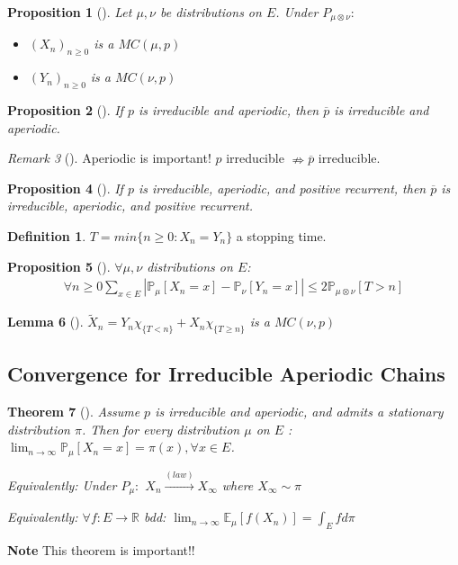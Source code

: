 \documentclass[12pt]{book}
\newtheorem{theorem}{Theorem}[section]
\newtheorem{prop}[theorem]{Proposition}
\newtheorem{lemma}[theorem]{Lemma}
\theoremstyle{definition}
\newtheorem{defn}{Definition}[section]
\theoremstyle{remark}
\newtheorem{rmk}[theorem]{Remark}
\begin{document}
\begin{prop}[]
	Let $\mu,\nu $ be distributions on $E$. Under $P_{\mu \otimes \nu }:$ 
\begin{itemize}
	\item $(X_n)_{n\geq 0}$ is a $MC(\mu ,p)$ 
	\item $(Y_n)_{n\geq 0}$ is a $MC(\nu ,p)$
\end{itemize}

\end{prop}

\begin{prop}[]
	If $p$ is irreducible and aperiodic, then $\overline{p}$ is irreducible and aperiodic.
\end{prop}

\begin{rmk}[]
	Aperiodic is important!  $p$ irreducible $\nRightarrow \overline{p}$ irreducible.
\end{rmk}

\begin{prop}[]
	If $p$ is irreducible, aperiodic, and positive recurrent, then $\overline{p}$ is irreducible, aperiodic, and positive recurrent.
\end{prop}

\begin{defn}
	$T=min\{n\geq 0: X_n=Y_n\}$ a stopping time.
\end{defn}

\begin{prop}[]
	$\forall \mu, \nu $ distributions on $E $: 
\begin{align}
\forall n\geq 0 \sum_{x \in E}^{} |\mathbb{P}_{\mu } \left[ X_n=x \right] - \mathbb{P}_{\nu} \left[Y_n=x  \right] | \leq 2 \mathbb{P}_{\mu \otimes \nu } \left[ T>n \right]
\end{align}
\end{prop}

\begin{lemma}[]
	$\tilde{X}_n = Y_n\chi_{\{T<n\}} + X_n \chi_{\{T \geq n\}} $ is a $MC(\nu, p)$
\end{lemma}

\subsection{Convergence for Irreducible Aperiodic Chains}
\begin{theorem}[]
	Assume $p$ is irreducible and aperiodic, and admits a stationary distribution $\pi $. Then for every distribution $\mu$ on $E$ : $\lim_{n \to \infty}\mathbb{P}_{\mu } \left[ X_n=x \right] = \pi(x), \forall x \in E$. 

	\noindent
	Equivalently: Under $P_\mu: $ $X_n \stackrel{(law)}{\to} X_\infty$ where $X_\infty \sim \pi$ 

	\noindent
	Equivalently: $\forall f:E \to \mathbb{R}$ bdd: $\lim_{n \to \infty} \mathbb{E}_{\mu } \left[ f(X_n) \right] = \int_{E}^{} f d \pi$
\end{theorem}
\textbf{Note} This theorem is important!! 
\end{document}
